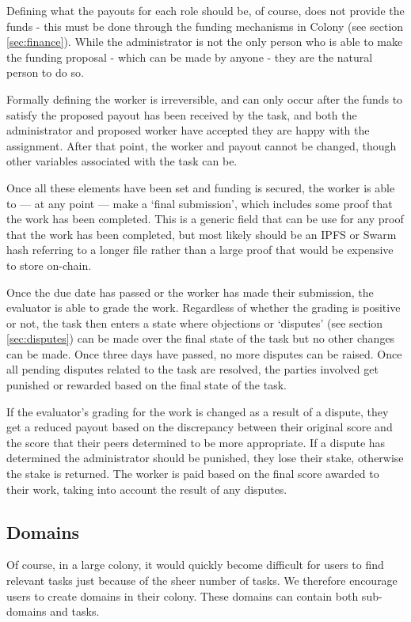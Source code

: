Defining what the payouts for each role should be, of course, does not provide the funds - this must be done through the funding mechanisms in Colony (see section \ref{sec:finance}). While the administrator is not the only person who is able to make the funding proposal - which can be made by anyone - they are the natural person to do so.

Formally defining the worker is irreversible, and can only occur after the funds to satisfy the proposed payout has been received by the task, and both the administrator and proposed worker have accepted they are happy with the assignment. After that point, the worker and payout cannot be changed, though other variables associated with the task can be.

Once all these elements have been set and funding is secured, the worker is able to --- at any point --- make a ‘final submission’, which includes some proof that the work has been completed. This is a generic field that can be use for any proof that the work has been completed, but most likely should be an IPFS or Swarm hash referring to a longer file rather than a large proof that would be expensive to store on-chain.

Once the due date has passed or the worker has made their submission, the evaluator is able to grade the work. Regardless of whether the grading is positive or not, the task then enters a state where objections or `disputes' (see section \ref{sec:disputes}) can be made over the final state of the task but no other changes can be made. Once three days have passed, no more disputes can be raised. Once all pending disputes related to the task are resolved, the parties involved get punished or rewarded based on the final state of the task.

If the evaluator’s grading for the work is changed as a result of a dispute, they get a reduced payout based on the discrepancy between their original score and the score that their peers determined to be more appropriate. If a dispute has determined the administrator should be punished, they lose their stake, otherwise the stake is returned. The worker is paid based on the final score awarded to their work, taking into account the result of any disputes.

\subsection{Domains}\label{sec:domains}

Of course, in a large colony, it would quickly become difficult for users to find relevant tasks just because of the sheer number of tasks. We therefore encourage users to create domains in their colony. These domains can contain both sub-domains and tasks. 

